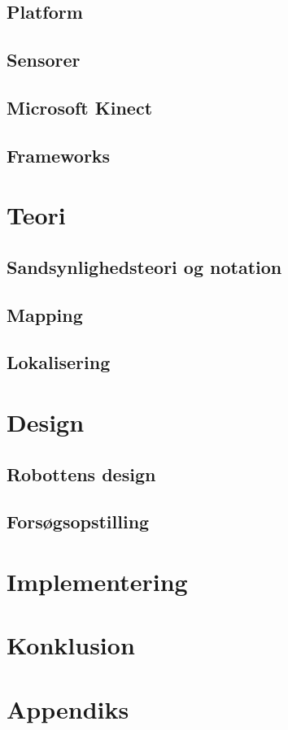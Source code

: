 \chapter{Platform}

\chapter{Sensorer}

\chapter{Microsoft Kinect}

\chapter{Frameworks}



\clearpage


\part{Teori}
\chapter{Sandsynlighedsteori og notation}

\chapter{Mapping}


\chapter{Lokalisering}


\part{Design}
\chapter{Robottens design}


\chapter{Forsøgsopstilling}

\part{Implementering}

\part{Konklusion}

\appendix
\part{Appendiks}



